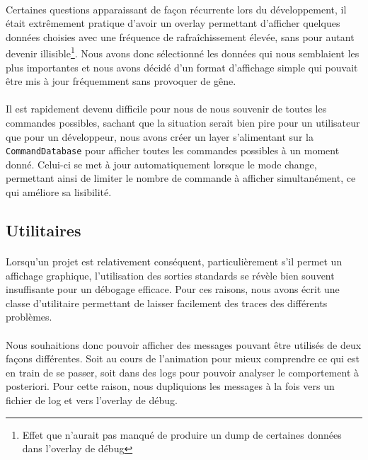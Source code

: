 \paragraph{}
Certaines questions apparaissant de façon récurrente lors du développement,
il était extrêmement pratique d'avoir un overlay permettant d'afficher
quelques données choisies avec une fréquence de rafraîchissement élevée, sans
pour autant devenir illisible\footnote{Effet que n'aurait pas manqué de
produire un dump de certaines données dans l'overlay de débug}. Nous avons
donc sélectionné les données qui nous semblaient les plus importantes et
nous avons décidé d'un format d'affichage simple qui pouvait être mis à jour
fréquemment sans provoquer de gêne.

\paragraph{}
Il est rapidement devenu difficile pour nous de nous souvenir de toutes les
commandes possibles, sachant que la situation serait bien pire pour un
utilisateur que pour un développeur, nous avons créer un layer s'alimentant
sur la \verb!CommandDatabase! pour afficher toutes les commandes possibles
à un moment donné. Celui-ci se met à jour automatiquement lorsque le mode
change, permettant ainsi de limiter le nombre de commande à afficher
simultanément, ce qui améliore sa lisibilité.


\subsection{Utilitaires}
\paragraph{}
Lorsqu'un projet est relativement conséquent, particulièrement s'il permet un
affichage graphique, l'utilisation des sorties standards se révèle bien
souvent insuffisante pour un débogage efficace. Pour ces raisons, nous avons
écrit une classe d'utilitaire permettant de laisser facilement des traces des
différents problèmes.

\paragraph{}
Nous souhaitions donc pouvoir afficher des messages pouvant être utilisés de
deux façons différentes. Soit au cours de l'animation pour mieux comprendre
ce qui est en train de se passer, soit dans des logs pour pouvoir analyser le
comportement à posteriori. Pour cette raison, nous dupliquions les messages à
la fois vers un fichier de log et vers l'overlay de débug.
